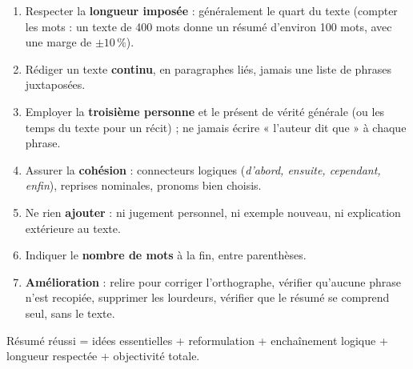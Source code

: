 \documentclass[11pt]{article}
\begin{document}
\begin{methode}
\begin{enumerate}
\item Respecter la \textbf{longueur imposée} : généralement le quart du texte (compter les mots : un texte de 400 mots donne un résumé d'environ 100 mots, avec une marge de $\pm 10\,\%$).
\item Rédiger un texte \textbf{continu}, en paragraphes liés, jamais une liste de phrases juxtaposées.
\item Employer la \textbf{troisième personne} et le présent de vérité générale (ou les temps du texte pour un récit) ; ne jamais écrire « l'auteur dit que » à chaque phrase.
\item Assurer la \textbf{cohésion} : connecteurs logiques (\emph{d'abord, ensuite, cependant, enfin}), reprises nominales, pronoms bien choisis.
\item Ne rien \textbf{ajouter} : ni jugement personnel, ni exemple nouveau, ni explication extérieure au texte.
\item Indiquer le \textbf{nombre de mots} à la fin, entre parenthèses.
\item \textbf{Amélioration} : relire pour corriger l'orthographe, vérifier qu'aucune phrase n'est recopiée, supprimer les lourdeurs, vérifier que le résumé se comprend seul, sans le texte.
\end{enumerate}
\begin{aretenir}
Résumé réussi = idées essentielles + reformulation + enchaînement logique + longueur respectée + objectivité totale.
\end{aretenir}
\end{methode}
\end{document}
